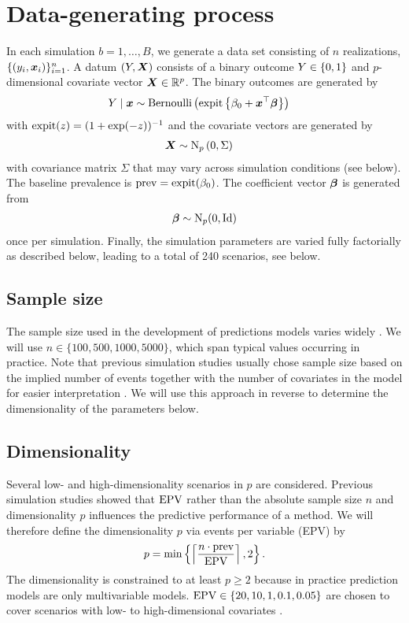 \documentclass[a4paper, 11pt]{article}\usepackage[]{graphicx}\usepackage[]{color}
\begin{document}
\section{Data-generating process} \label{sec:dgp}

In each simulation $b = 1, \dots, B$, we generate a data set consisting of $n$
realizations, \ie $\{(y_i, \text{\boldmath$x$}_i)\}_{i=1}^n$. A datum $(Y, \text{\boldmath$X$})$ consists of
a binary outcome $Y \in \{0, 1\}$ and $p$-dimensional covariate vector
$\text{\boldmath$X$} \in \mathbb{R}^p$. The binary outcomes are generated by
\begin{align*}
  Y \mid \text{\boldmath$x$} &\sim \operatorname{Bernoulli}\left(\operatorname{expit}\left\{\beta_0 +
	\text{\boldmath$x$}^\top\text{\boldmath$\beta$}\right\}\right)
\end{align*}
with $\operatorname{expit}(z) = (1 + \exp(-z))^{-1}$ and the covariate vectors are generated by
\begin{align*}
  \text{\boldmath$X$} &\sim \operatorname{N}_p\left(0, \Sigma\right)
\end{align*}
with covariance matrix $\Sigma$ that may vary across simulation conditions (see below).
The baseline prevalence is $\operatorname{prev} = \operatorname{expit}(\beta_0)$. The coefficient vector
$\text{\boldmath$\beta$}$ is generated from
\begin{align*}
  \text{\boldmath$\beta$} \sim \operatorname{N}_p(0, \operatorname{Id})
\end{align*}
once per simulation. Finally, the simulation parameters are varied
fully factorially as described below, leading to a total of 240
scenarios, see below.

\subsection*{Sample size}
The sample size used in the development of predictions models varies widely
\citep{Damen2016}. We will use $n \in \{100, 500, 1000, 5000\}$, which span typical values
occurring in practice. Note that previous simulation studies usually chose sample
size based on the implied number of events together with the number of covariates
in the model for easier interpretation \citep{vanSmeden2018, Riley2018}. We will use this approach in
reverse to determine the dimensionality of the parameters below.

\subsection*{Dimensionality}
Several low- and high-dimensionality scenarios in $p$ are considered. Previous
simulation studies showed that $\operatorname{EPV}$ rather than the absolute sample size $n$
and dimensionality $p$ influences the predictive performance of a method. We
will therefore define the dimensionality $p$ via events per variable (EPV)
by $$p = \min\left\{\left\lceil\frac{n \cdot \operatorname{prev}}{\operatorname{EPV}}\right\rceil, 2\right\}.$$ The dimensionality is
constrained to at least $p \geq 2$ because in practice prediction models are
only multivariable models. $\operatorname{EPV} \in \{20, 10, 1, 0.1, 0.05\}$ are chosen to cover
scenarios with low- to high-dimensional covariates \citep[\cf][]{vanSmeden2018}.
\end{document}
